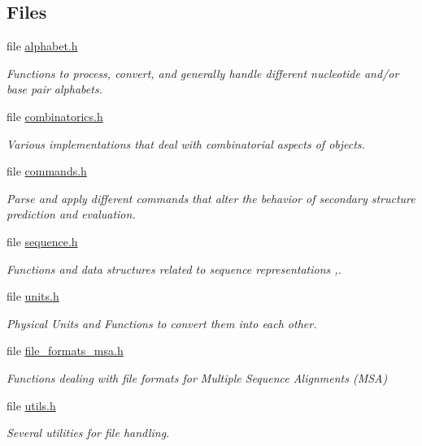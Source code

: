 \subsection*{Files}
\begin{DoxyCompactItemize}
\item 
file \mbox{\hyperlink{alphabet_8h}{alphabet.\+h}}
\begin{DoxyCompactList}\small\item\em Functions to process, convert, and generally handle different nucleotide and/or base pair alphabets. \end{DoxyCompactList}\item 
file \mbox{\hyperlink{combinatorics_8h}{combinatorics.\+h}}
\begin{DoxyCompactList}\small\item\em Various implementations that deal with combinatorial aspects of objects. \end{DoxyCompactList}\item 
file \mbox{\hyperlink{commands_8h}{commands.\+h}}
\begin{DoxyCompactList}\small\item\em Parse and apply different commands that alter the behavior of secondary structure prediction and evaluation. \end{DoxyCompactList}\item 
file \mbox{\hyperlink{sequence_8h}{sequence.\+h}}
\begin{DoxyCompactList}\small\item\em Functions and data structures related to sequence representations ,. \end{DoxyCompactList}\item 
file \mbox{\hyperlink{units_8h}{units.\+h}}
\begin{DoxyCompactList}\small\item\em Physical Units and Functions to convert them into each other. \end{DoxyCompactList}\item 
file \mbox{\hyperlink{io_2file__formats__msa_8h}{file\+\_\+formats\+\_\+msa.\+h}}
\begin{DoxyCompactList}\small\item\em Functions dealing with file formats for Multiple Sequence Alignments (M\+SA) \end{DoxyCompactList}\item 
file \mbox{\hyperlink{io_2utils_8h}{utils.\+h}}
\begin{DoxyCompactList}\small\item\em Several utilities for file handling. \end{DoxyCompactList}\item 

\end{DoxyCompactItemize}
